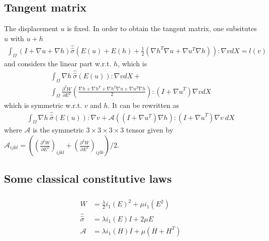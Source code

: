 \documentclass[a4paper,11pt,english]{sphinxmanual}
\begin{document}
\subsection{Tangent matrix}
\label{\detokenize{userdoc/model_nonlinear_elasticity:tangent-matrix}}
The displacement \(u\) is fixed. In order to obtain the tangent matrix, one subsitutes \(u\) with \(u+h\)
\begin{equation*}
\begin{split}\int_\Omega(I + {\nabla u} + {\nabla h}){\hat{\hat{\sigma}}}( E(u)+ E(h) + \frac{1}{2}({\nabla h^T}{\nabla u}+{\nabla u^T}{\nabla h})) : {\nabla v}  dX = l(v)\end{split}
\end{equation*}
and considers the linear part w.r.t. \(h\), which is
\begin{equation*}
\begin{split}\int_\Omega{\nabla h}~{\hat{\hat{\sigma}}}( E(u)) : {\nabla v}  dX +\\
\int_\Omega \frac{\partial^2 W}{\partial E^2}\left(\frac{{\nabla h}+{\nabla h^T}+{\nabla h^T}{\nabla u}+{\nabla u^T}{\nabla h}}{2}\right) : (I+{\nabla u}^T){\nabla v}  dX\end{split}
\end{equation*}
which is symmetric w.r.t. \(v\) and \(h\). It can be rewritten as
\begin{equation*}
\begin{split}\int_\Omega {\nabla h}~{\hat{\hat{\sigma}}}( E(u)) : {\nabla v}  + \mathcal{A}((I+{\nabla u^T}){\nabla h}):(I+{\nabla u}^T){\nabla v}~ dX\end{split}
\end{equation*}
where \(\mathcal{A}\) is the symmetric \(3\times3\times3\times3\) tensor given by \(\mathcal{A}_{ijkl} = ((\frac{\partial^2 W}{\partial E^2})_{ijkl} + (\frac{\partial^2 W}{\partial E^2})_{ijlk})/2\).


\subsection{Some classical constitutive laws}
\label{\detokenize{userdoc/model_nonlinear_elasticity:some-classical-constitutive-laws}}

\subsubsection{}
\label{\detokenize{userdoc/model_nonlinear_elasticity:linearized-saint-venant-kirchhoff-law-small-deformations}}\begin{equation*}
\begin{split}{W} &= \frac{\lambda}{2}i_1( E)^2 + \mu i_1( E^2)\\
{\hat{\hat{\sigma}}}   &= \lambda i_1( E)I + 2\mu E\\
\mathcal{A} &= \lambda i_1(H)I + \mu (H + H^T)\end{split}
\end{equation*}
\end{document}
